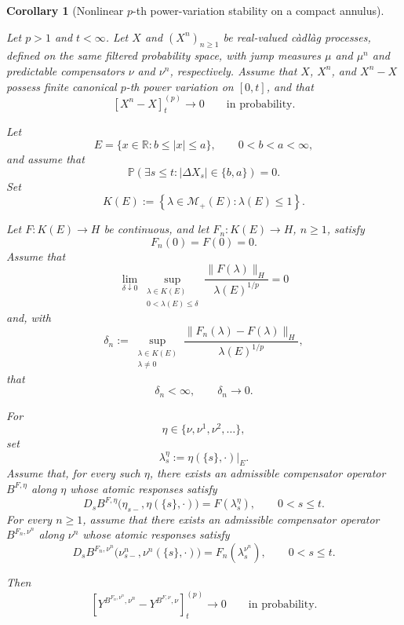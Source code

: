 \documentclass[a4paper,10pt]{article}
\newtheorem{corollary}[thm]{Corollary}
\renewcommand{\P}{\mathbb P}
\begin{document}
\begin{corollary}
[Nonlinear \(p\)-th power-variation stability on a compact annulus]
\label{cor:nonlinear-pvar-stability-compact-annulus}

Let \(p>1\) and \(t<\infty\). Let \(X\) and
\((X^n)_{n\ge1}\) be real-valued càdlàg processes, defined on the same
filtered probability space, with jump measures \(\mu\) and \(\mu^n\)
and predictable compensators \(\nu\) and \(\nu^n\), respectively.
Assume that \(X\), \(X^n\), and \(X^n-X\) possess finite canonical
\(p\)-th power variation on \([0,t]\), and that
\[
        [X^n-X]^{(p)}_t
        \longrightarrow0
        \qquad\text{in probability}.
\]

Let
\[
        E=\{x\in\mathbb R:b\le |x|\le a\},
        \qquad 0<b<a<\infty,
\]
and assume that
\[
\P\left(
        \exists s\le t:
        |\Delta X_s|\in\{b,a\}
\right)
=
0.
\]
Set
\[
K(E)
:=
\left\{
        \lambda\in\mathcal M_+(E):
        \lambda(E)\le1
\right\}.
\]

Let \(F:K(E)\to H\) be continuous, and let
\(F_n:K(E)\to H\), \(n\ge1\), satisfy
\[
        F_n(0)=F(0)=0.
\]
Assume that
\[
\lim_{\delta\downarrow0}
\sup_{\substack{\lambda\in K(E)\\
                 0<\lambda(E)\le\delta}}
\frac{\lVert F(\lambda)\rVert_H}
     {\lambda(E)^{1/p}}
=
0
\]
and, with
\[
\delta_n
:=
\sup_{\substack{\lambda\in K(E)\\\lambda\ne0}}
\frac{
        \lVert F_n(\lambda)-F(\lambda)\rVert_H
}{
        \lambda(E)^{1/p}
},
\]
that
\[
        \delta_n<\infty,
        \qquad
        \delta_n\longrightarrow0.
\]

For
\[
        \eta\in\{\nu,\nu^1,\nu^2,\ldots\},
\]
set
\[
        \lambda_s^\eta
        :=
        \eta(\{s\},\cdot)|_E.
\]
Assume that, for every such \(\eta\), there exists an admissible
compensator operator \(B^{F,\eta}\) along \(\eta\) whose atomic
responses satisfy
\[
D_sB^{F,\eta}
\bigl(
        \eta_{s-},
        \eta(\{s\},\cdot)
\bigr)
=
F(\lambda_s^\eta),
\qquad 0<s\le t.
\]
For every \(n\ge1\), assume that there exists an admissible compensator
operator \(B^{F_n,\nu^n}\) along \(\nu^n\) whose atomic responses
satisfy
\[
D_sB^{F_n,\nu^n}
\bigl(
        \nu^n_{s-},
        \nu^n(\{s\},\cdot)
\bigr)
=
F_n(\lambda_s^{\nu^n}),
\qquad 0<s\le t.
\]

Then
\[
\left[
Y^{B^{F_n,\nu^n},\nu^n}
-
Y^{B^{F,\nu},\nu}
\right]^{(p)}_t
\longrightarrow0
\qquad\text{in probability}.
\]
\end{corollary}
\end{document}
